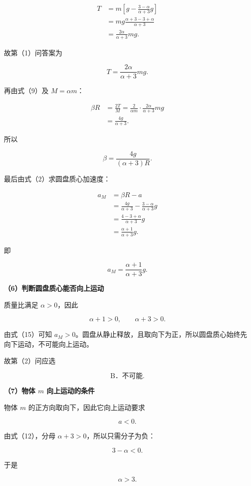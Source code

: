 \documentclass[12pt,a4paper,UTF8]{ctexart}
\begin{document}
\[
\begin{aligned}
T
&=m\left[g-\frac{3-\alpha}{\alpha+3}g\right]\\
&=mg\frac{\alpha+3-3+\alpha}{\alpha+3}\\
&=\frac{2\alpha}{\alpha+3}mg.
\end{aligned}
\]

故第（1）问答案为

\[
\boxed{T=\frac{2\alpha}{\alpha+3}mg}.
\tag{13}
\]

再由式（9）及 \(M=\alpha m\)：

\[
\begin{aligned}
\beta R
&=\frac{2T}{M}
=\frac{2}{\alpha m}\cdot
\frac{2\alpha}{\alpha+3}mg\\
&=\frac{4g}{\alpha+3}.
\end{aligned}
\]

所以

\[
\boxed{\beta=\frac{4g}{(\alpha+3)R}}.
\tag{14}
\]

最后由式（2）求圆盘质心加速度：

\[
\begin{aligned}
a_M
&=\beta R-a\\
&=\frac{4g}{\alpha+3}
-\frac{3-\alpha}{\alpha+3}g\\
&=\frac{4-3+\alpha}{\alpha+3}g\\
&=\frac{\alpha+1}{\alpha+3}g.
\end{aligned}
\]

即

\[
\boxed{a_M=\frac{\alpha+1}{\alpha+3}g}.
\tag{15}
\]

\textbf{（6）判断圆盘质心能否向上运动}

质量比满足 \(\alpha>0\)，因此

\[
\alpha+1>0,
\qquad
\alpha+3>0.
\]

由式（15）可知
\(a_M>0\)。圆盘从静止释放，且取向下为正，所以圆盘质心始终先向下运动，不可能向上运动。

故第（2）问应选

\[
\boxed{\text{B．不可能}}.
\tag{16}
\]

\textbf{（7）物体 \(m\) 向上运动的条件}

物体 \(m\) 的正方向取向下，因此它向上运动要求

\[
a<0.
\]

由式（12），分母 \(\alpha+3>0\)，所以只需分子为负：

\[
3-\alpha<0.
\]

于是

\[
\boxed{\alpha>3}.
\tag{17}
\]
\end{document}
